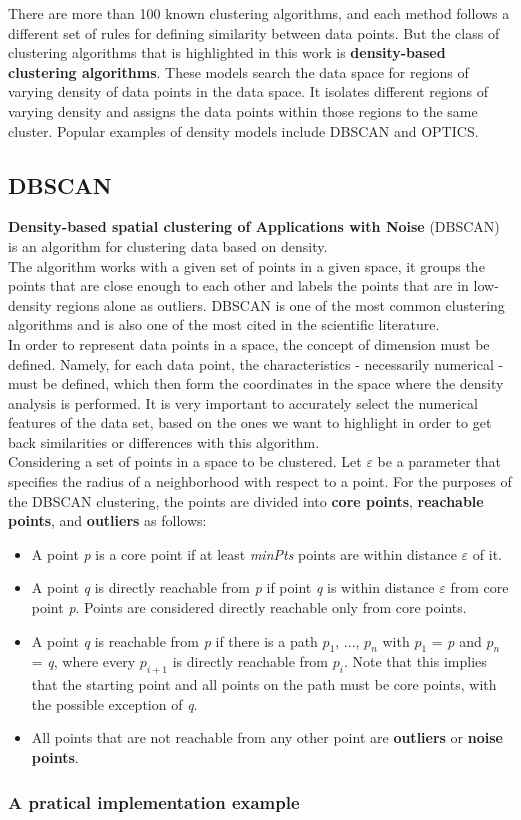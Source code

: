     There are more than 100 known clustering algorithms, and each method follows a different set of rules for defining similarity between data points. But the class of clustering algorithms that is highlighted in this work is \textbf{density-based clustering algorithms}. These models search the data space for regions of varying density of data points in the data space. It isolates different regions of varying density and assigns the data points within those regions to the same cluster. Popular examples of density models include DBSCAN and OPTICS.
    
    
    \subsection{DBSCAN}
    \textbf{Density-based spatial clustering of Applications with Noise} (DBSCAN) is an algorithm for clustering data based on density.
    \\
    The algorithm works with a given set of points in a given space, it groups the points that are close enough to each other and labels the points that are in low-density regions alone as outliers. DBSCAN is one of the most common clustering algorithms and is also one of the most cited in the scientific literature.
    \\
    In order to represent data points in a space, the concept of dimension must be defined. Namely, for each data point, the characteristics - necessarily numerical - must be defined, which then form the coordinates in the space where the density analysis is performed. It is very important to accurately select the numerical features of the data set, based on the ones we want to highlight in order to get back similarities or differences with this algorithm.
    \\
    Considering a set of points in a space to be clustered. Let $\varepsilon$ be a parameter that specifies the radius of a neighborhood with respect to a point.
    For the purposes of the DBSCAN clustering, the points are divided into \textbf{core points}, \textbf{reachable points}, and \textbf{outliers} as follows:
        
    \begin{itemize}
    \item A point \textit{p} is a core point if at least \textit{minPts} points are within distance $\varepsilon$ of it.
    \item A point \textit{q} is directly reachable from \textit{p} if point \textit{q} is within distance $\varepsilon$ from core point \textit{p}. Points are considered directly reachable only from core points.
    \item A point \textit{q} is reachable from \textit{p} if there is a path \textit{$p_1$}, ..., \textit{$p_n$} with \textit{$p_1$} = \textit{p} and \textit{$p_n$} = \textit{q}, where every \textit{$p_{i+1}$} is directly reachable from \textit{$p_i$}. Note that this implies that the starting point and all points on the path must be core points, with the possible exception of \textit{q}.
    \item All points that are not reachable from any other point are \textbf{outliers} or \textbf{noise points}.
    \end{itemize}
    
    
    \subsubsection{A pratical implementation example}
    